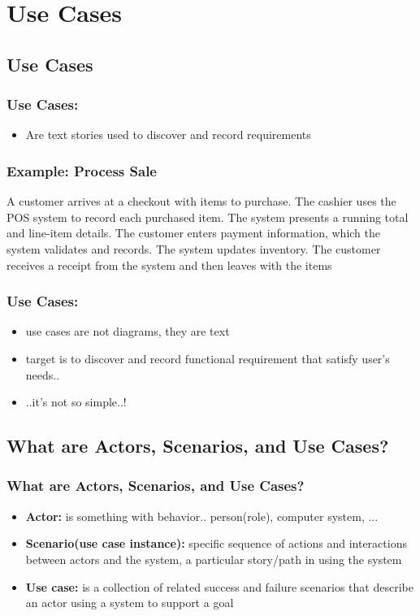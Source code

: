 \documentclass{beamer}
\begin{document}
\section{Use Cases}
\subsection{Use Cases}
\begin{frame}
	\frametitle{Use Cases:}
	\begin{itemize}
	\item<+-> Are text stories used to discover and record requirements
	\end{itemize}
\end{frame}

\begin{frame}
	\frametitle{Example: Process Sale}
	\begin{center}
	A customer arrives at a checkout with items to purchase. The cashier uses
the POS system to record each purchased item. The system presents a running total and
line-item details. The customer enters payment information, which the system validates and
records. The system updates inventory. The customer receives a receipt from the system
and then leaves with the items
	\end{center}
\end{frame}

\begin{frame}
	\frametitle{Use Cases:}
	\begin{itemize}
	\item<+-> use cases are not diagrams, they are text
	\item<+-> target is to discover and record functional requirement that satisfy user's needs..
	\item<+-> ..it's not so simple..!
	\end{itemize}
\end{frame}

\subsection{What are Actors, Scenarios, and Use Cases?}
\begin{frame}
	\frametitle{What are Actors, Scenarios, and Use Cases?}
	\begin{itemize}
	\item<+-> \textbf{Actor:} is something with behavior.. person(role), computer system, ...
	\item<+-> \textbf{Scenario(use case instance):} specific sequence of actions and interactions between actors and the system, a particular story/path in using the system
	\item<+-> \textbf{Use case:} is a collection of related success and failure scenarios that describe
an actor using a system to support a goal 
	\end{itemize}
\end{frame}
\end{document}

